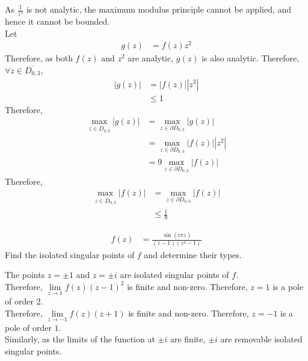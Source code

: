 \documentclass[titlepage, fleqn, a4paper, 12pt, twoside]{article}
\theoremstyle{definition}
\theoremstyle{theorem}
\begin{document}
\begin{solution}
	As $\frac{1}{z^2}$ is not analytic, the maximum modulus principle cannot be applied, and hence it cannot be bounded.\\
	Let
	\begin{align*}
		g(z) & = f(z) z^2
	\end{align*}
	Therefore, as both $f(z)$ and $z^2$ are analytic, $g(z)$ is also analytic.
	Therefore, $\forall z \in \overline{D_{0,3}}$,
	\begin{align*}
		\left| g(z) \right| & = \left| f(z) \right| \left| z^2 \right| \\
                                    & \le 1
	\end{align*}
	Therefore,
	\begin{align*}
		\max\limits_{z \in \overline{D_{0,3}}} \left| g(z) \right| & = \max\limits_{z \in \partial D_{0,3}} \left| g(z) \right|                    \\
                                                                           & = \max\limits_{z \in \partial D_{0,3}} \left| f(z) \right| \left| z^2 \right| \\
                                                                           & = 9 \max\limits_{z \in \partial D_{0,3}} \left| f(z) \right|
	\end{align*}
	Therefore,
	\begin{align*}
		\max\limits_{z \in \overline{D_{0,3}}} \left| f(z) \right| & = \max\limits_{z \in \partial D_{0,3}} \left| f(z) \right| \\
                                                                           & \le \frac{1}{9}
	\end{align*}
\end{solution}

\begin{question}{14}
	\begin{align*}
		f(z) & = \frac{\sin(i \pi z)}{(z - 1) \left( z^4 - 1 \right)}
	\end{align*}
	Find the isolated singular points of $f$ and determine their types.
\end{question}

\begin{solution}
	The points $z = \pm 1$ and $z = \pm i$ are isolated singular points of $f$.\\
	Therefore, $\lim\limits_{z \to 1} f(z) (z - 1)^2$ is finite and non-zero.
	Therefore, $z = 1$ is a pole of order $2$.\\
	Therefore, $\lim\limits_{z \to -1} f(z) (z + 1)$ is finite and non-zero.
	Therefore, $z = -1$ is a pole of order $1$.\\
	Similarly, as the limits of the function at $\pm i$ are finite, $\pm i$ are removable isolated singular points.
\end{solution}
\end{document}
